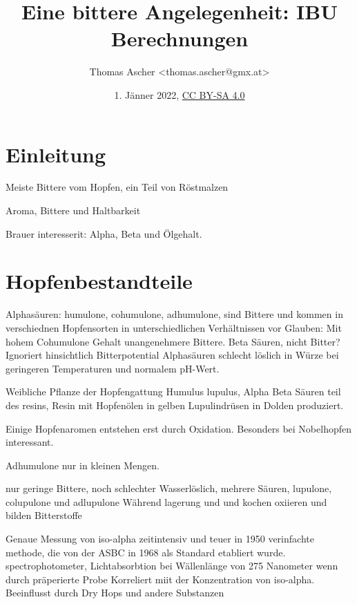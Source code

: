 \documentclass[a4paper,parskip=half]{scrartcl}
\title{Eine bittere Angelegenheit: IBU Berechnungen}
\author{Thomas Ascher <thomas.ascher@gmx.at>}
\date{1. Jänner 2022, \href{http://creativecommons.org/licenses/by-sa/4.0/}{CC BY-SA 4.0}}
\begin{document}
\maketitle

\section*{Einleitung}

\parencite{Bastgen2020}

Meiste Bittere vom Hopfen, ein Teil von Röstmalzen \parencite[11]{Garetz1994}

\parencite[10]{Garetz1994}
Aroma, Bittere und Haltbarkeit

\parencite[103]{Garetz1994}
Brauer interesserit: Alpha, Beta und Ölgehalt.


\section*{Hopfenbestandteile}

\parencite[11]{Garetz1994}
Alphasäuren: humulone, cohumulone, adhumulone, sind Bittere und kommen in
verschiednen Hopfensorten in unterschiedlichen Verhältnissen vor
Glauben: Mit hohem Cohumulone Gehalt unangenehmere Bittere.
Beta Säuren, nicht Bitter? Ignoriert hinsichtlich Bitterpotential
Alphasäuren schlecht löslich in Würze bei geringeren Temperaturen
und normalem pH-Wert.

\parencite[20]{Garetz1994}
Weibliche Pflanze der Hopfengattung Humulus lupulus, Alpha Beta
Säuren teil des resins, Resin mit Hopfenölen in gelben
Lupulindrüsen in Dolden produziert.

\parencite[100]{Garetz1994} Einige Hopfenaromen entstehen erst
durch Oxidation. Besonders bei Nobelhopfen interessant.

\parencite[119]{Garetz1994} 
Adhumulone nur in kleinen Mengen.

\parencite[120]{Garetz1994} 
nur geringe Bittere, noch schlechter Wasserlöslich, mehrere Säuren,
lupulone, colupulone und adlupulone
Während lagerung und und kochen oxiieren und bilden Bitterstoffe

\parencite[60]{Beechum2017}
Genaue Messung von iso-alpha zeitintensiv und teuer
in 1950 verinfachte methode, die von der ASBC in 1968
als Standard etabliert wurde.
spectrophotometer, Lichtabsorbtion bei Wällenlänge
von 275 Nanometer wenn durch präperierte Probe
Korreliert miit der Konzentration von iso-alpha.
Beeinflusst durch Dry Hops und andere Substanzen
\end{document}
